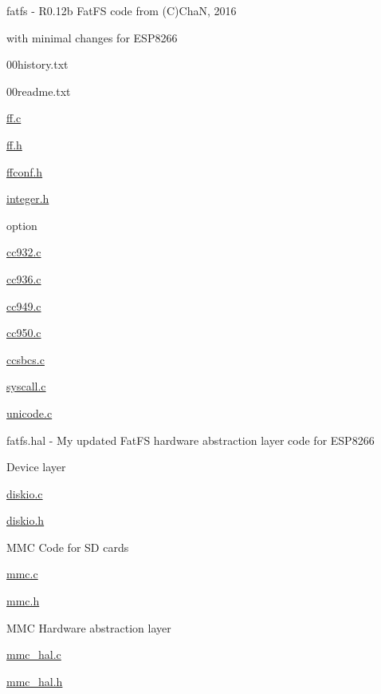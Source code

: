fatfs -\/ R0.\+12b Fat\+FS code from (C)ChaN, 2016
\begin{DoxyItemize}
\item with minimal changes for E\+S\+P8266
\begin{DoxyItemize}
\item 00history.\+txt
\item 00readme.\+txt
\item \hyperlink{ff_8c}{ff.\+c}
\item \hyperlink{ff_8h}{ff.\+h}
\item \hyperlink{ffconf_8h}{ffconf.\+h}
\item \hyperlink{integer_8h}{integer.\+h}
\item option
\begin{DoxyItemize}
\item \hyperlink{cc932_8c}{cc932.\+c}
\item \hyperlink{cc936_8c}{cc936.\+c}
\item \hyperlink{cc949_8c}{cc949.\+c}
\item \hyperlink{cc950_8c}{cc950.\+c}
\item \hyperlink{ccsbcs_8c}{ccsbcs.\+c}
\item \hyperlink{syscall_8c}{syscall.\+c}
\item \hyperlink{unicode_8c}{unicode.\+c}
\end{DoxyItemize}
\end{DoxyItemize}
\end{DoxyItemize}

fatfs.\+hal -\/ My updated Fat\+FS hardware abstraction layer code for E\+S\+P8266
\begin{DoxyItemize}
\item Device layer
\begin{DoxyItemize}
\item \hyperlink{diskio_8c}{diskio.\+c}
\item \hyperlink{diskio_8h}{diskio.\+h}
\end{DoxyItemize}
\item M\+MC Code for SD cards
\begin{DoxyItemize}
\item \hyperlink{mmc_8c}{mmc.\+c}
\item \hyperlink{mmc_8h}{mmc.\+h}
\end{DoxyItemize}
\item M\+MC Hardware abstraction layer
\begin{DoxyItemize}
\item \hyperlink{mmc__hal_8c}{mmc\+\_\+hal.\+c}
\item \hyperlink{mmc__hal_8h}{mmc\+\_\+hal.\+h}
\end{DoxyItemize}
\end{DoxyItemize}

